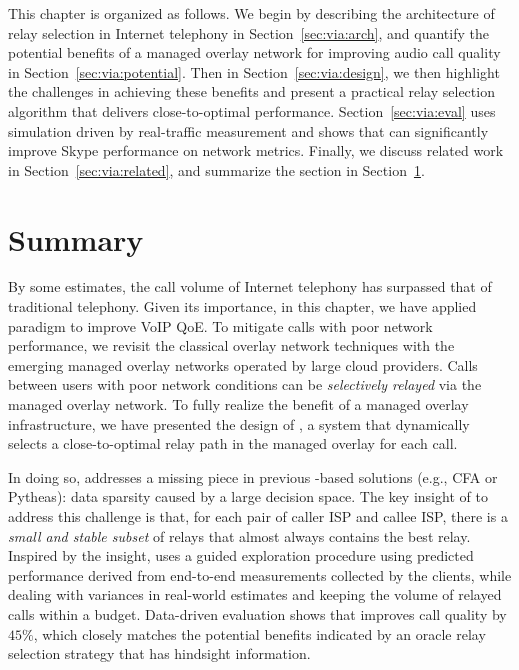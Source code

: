 This chapter is organized as follows.
We begin by describing the architecture of relay selection in Internet telephony in Section~\ref{sec:via:arch}, and quantify the potential benefits of a managed overlay
network for improving audio call quality in Section~\ref{sec:via:potential}.
Then in Section~\ref{sec:via:design}, we then highlight the challenges in achieving these benefits and present 
a practical relay selection algorithm
that delivers close-to-optimal performance.
Section~\ref{sec:via:eval} uses simulation driven by real-traffic measurement and shows 
that \hybrid can significantly improve
Skype performance on network metrics.
Finally, we discuss related work in Section~\ref{sec:via:related}, and 
summarize the section in Section~\ref{sec:via:summary}.













\section{Summary}
\label{sec:via:summary}

By some estimates, the call volume of Internet telephony has surpassed that 
of traditional telephony. Given its importance, in this chapter, we 
have applied \ddn paradigm to improve VoIP QoE.
To mitigate calls with poor network performance, we revisit the classical overlay network 
techniques with the emerging managed overlay networks operated by large cloud providers.
Calls between users with poor network conditions can be {\em selectively relayed}
via the managed overlay network.
To fully realize the benefit of a managed overlay infrastructure, we have presented the 
design of  \hybrid, a system that dynamically selects a close-to-optimal relay
path in the managed overlay for each call.

In doing so, \hybrid addresses a missing piece in previous \ddn-based solutions 
(e.g., CFA or Pytheas): data sparsity caused by a large decision space.
The key insight of \hybrid to address this challenge is that, for each pair of caller 
ISP and callee ISP, there is a {\em small and stable subset} of relays that 
almost always contains the best relay.
Inspired by the insight, \hybrid uses a guided 
 exploration procedure using predicted performance 
 derived from end-to-end measurements collected by 
 the clients, while dealing with variances in real-world estimates and keeping 
 the volume of relayed calls within a budget. 
 Data-driven evaluation shows that \hybrid improves call quality by 
 $45\%$, which closely matches the potential benefits indicated by an oracle 
relay selection strategy that has hindsight information. 

